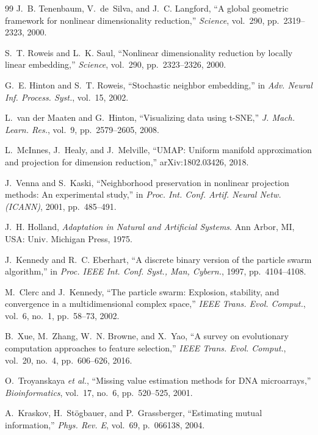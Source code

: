 \documentclass[conference]{IEEEtran}
\begin{document}
\begin{thebibliography}{99}
 J.~B. Tenenbaum, V.~de~Silva, and J.~C. Langford, ``A global geometric framework for nonlinear dimensionality reduction,'' \textit{Science}, vol.~290, pp.~2319--2323, 2000.

 S.~T. Roweis and L.~K. Saul, ``Nonlinear dimensionality reduction by locally linear embedding,'' \textit{Science}, vol.~290, pp.~2323--2326, 2000.

 G.~E. Hinton and S.~T. Roweis, ``Stochastic neighbor embedding,'' in \textit{Adv. Neural Inf. Process. Syst.}, vol.~15, 2002.

 L.~van der Maaten and G.~Hinton, ``Visualizing data using t-SNE,'' \textit{J. Mach. Learn. Res.}, vol.~9, pp.~2579--2605, 2008.

 L.~McInnes, J.~Healy, and J.~Melville, ``UMAP: Uniform manifold approximation and projection for dimension reduction,'' arXiv:1802.03426, 2018.

 J.~Venna and S.~Kaski, ``Neighborhood preservation in nonlinear projection methods: An experimental study,'' in \textit{Proc. Int. Conf. Artif. Neural Netw. (ICANN)}, 2001, pp.~485--491.

 J.~H. Holland, \textit{Adaptation in Natural and Artificial Systems}. Ann Arbor, MI, USA: Univ. Michigan Press, 1975.

 J.~Kennedy and R.~C. Eberhart, ``A discrete binary version of the particle swarm algorithm,'' in \textit{Proc. IEEE Int. Conf. Syst., Man, Cybern.}, 1997, pp.~4104--4108.

 M.~Clerc and J.~Kennedy, ``The particle swarm: Explosion, stability, and convergence in a multidimensional complex space,'' \textit{IEEE Trans. Evol. Comput.}, vol.~6, no.~1, pp.~58--73, 2002.

 B.~Xue, M.~Zhang, W.~N. Browne, and X.~Yao, ``A survey on evolutionary computation approaches to feature selection,'' \textit{IEEE Trans. Evol. Comput.}, vol.~20, no.~4, pp.~606--626, 2016.

 O.~Troyanskaya \textit{et al.}, ``Missing value estimation methods for DNA microarrays,'' \textit{Bioinformatics}, vol.~17, no.~6, pp.~520--525, 2001.

 A.~Kraskov, H.~St\"{o}gbauer, and P.~Grassberger, ``Estimating mutual information,'' \textit{Phys. Rev. E}, vol.~69, p.~066138, 2004.


\end{thebibliography}
\end{document}
